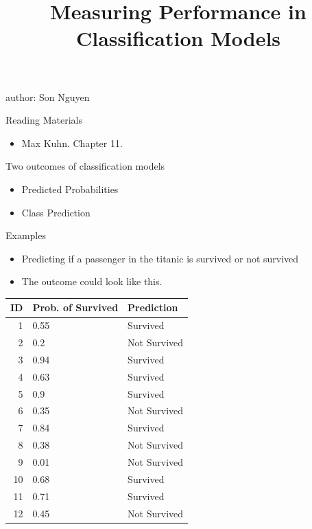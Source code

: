 \documentclass[
  ignorenonframetext,
]{beamer}
\title{Measuring Performance in Classification Models}
\author{}
\date{\vspace{-2.5em}}
\providecommand{\tightlist}{%
  \setlength{\itemsep}{0pt}\setlength{\parskip}{0pt}}
\begin{document}
\frame{\titlepage}

\begin{frame}

author: Son Nguyen

\end{frame}

\begin{frame}{Reading Materials}
\protect\hypertarget{reading-materials}{}

\begin{itemize}
\tightlist
\item
  Max Kuhn. Chapter 11.
\end{itemize}

\end{frame}

\begin{frame}{Two outcomes of classification models}
\protect\hypertarget{two-outcomes-of-classification-models}{}

\begin{itemize}
\tightlist
\item
  Predicted Probabilities
\item
  Class Prediction
\end{itemize}

\end{frame}

\begin{frame}{Examples}
\protect\hypertarget{examples}{}

\begin{itemize}
\tightlist
\item
  Predicting if a passenger in the titanic is survived or not survived
\item
  The outcome could look like this.
\end{itemize}

\begin{longtable}[]{@{}rll@{}}
\toprule
ID & Prob. of Survived & Prediction\tabularnewline
\midrule
\endhead
1 & 0.55 & Survived\tabularnewline
2 & 0.2 & Not Survived\tabularnewline
3 & 0.94 & Survived\tabularnewline
4 & 0.63 & Survived\tabularnewline
5 & 0.9 & Survived\tabularnewline
6 & 0.35 & Not Survived\tabularnewline
7 & 0.84 & Survived\tabularnewline
8 & 0.38 & Not Survived\tabularnewline
9 & 0.01 & Not Survived\tabularnewline
10 & 0.68 & Survived\tabularnewline
11 & 0.71 & Survived\tabularnewline
12 & 0.45 & Not Survived\tabularnewline
\bottomrule
\end{longtable}

\end{frame}
\end{document}
